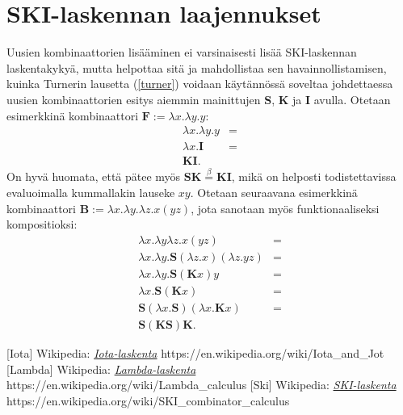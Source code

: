 \documentclass[a4paper,12pt]{amsart}
\begin{document}
\section{SKI-laskennan laajennukset}
Uusien kombinaattorien lisääminen ei varsinaisesti lisää SKI-laskennan laskentakykyä, mutta helpottaa sitä ja mahdollistaa sen havainnollistamisen, kuinka Turnerin lausetta (\ref{turner}) voidaan käytännössä soveltaa johdettaessa uusien kombinaattorien esitys aiemmin mainittujen $\mathbf{S}$, $\mathbf{K}$ ja $\mathbf{I}$ avulla. Otetaan esimerkkinä kombinaattori $\mathbf{F}:=\lambda x.\lambda y.y$:
\begin{equation}
\begin{split}
\lambda x.\lambda y.y &= \\
\lambda x.\mathbf{I} &= \\
\mathbf{KI}.
\end{split}
\end{equation}
On hyvä huomata, että pätee myös $\mathbf{SK}\stackrel{\beta}{=}\mathbf{KI}$, mikä on helposti todistettavissa evaluoimalla kummallakin lauseke $xy$. Otetaan seuraavana esimerkkinä kombinaattori $\mathbf{B}:=\lambda x.\lambda y.\lambda z.x(yz)$, jota sanotaan myös funktionaaliseksi kompositioksi:
\begin{equation}
\begin{split}
\lambda x.\lambda y\lambda z.x(yz) &= \\
\lambda x.\lambda y.\mathbf{S}(\lambda z.x)(\lambda z.yz) &= \\
\lambda x.\lambda y.\mathbf{S}(\mathbf{K}x)y &= \\
\lambda x.\mathbf{S}(\mathbf{K}x) &= \\
\mathbf{S}(\lambda x.\mathbf{S})(\lambda x.\mathbf{K}x) &= \\
\mathbf{S(KS)K}.
\end{split}
\end{equation}
\begin{thebibliography}{99}
[Iota] Wikipedia: \href{https://en.wikipedia.org/wiki/Iota\_and\_Jot}{\emph{Iota-laskenta}}
https://en.wikipedia.org/wiki/Iota\_and\_Jot
[Lambda] Wikipedia: \href{https://en.wikipedia.org/wiki/Lambda\_calculus}{\emph{Lambda-laskenta}} https://en.wikipedia.org/wiki/Lambda\_calculus
[Ski] Wikipedia: \href{https://en.wikipedia.org/wiki/SKI\_combinator\_calculus}{\emph{SKI-laskenta}} https://en.wikipedia.org/wiki/SKI\_combinator\_calculus
\end{thebibliography}
\end{document}
